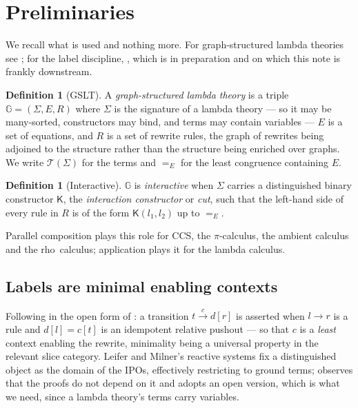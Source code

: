 \documentclass[11pt]{article}
\theoremstyle{plain}
\theoremstyle{definition}
\newtheorem{definition}[theorem]{Definition}
\newcommand{\rhoc}{\textsf{rho}}
\newcommand{\Kc}{\mathsf{K}}
\newcommand{\Gg}{\mathbb{G}}
\newcommand{\Terms}{\mathcal{T}}
\begin{document}
\section{Preliminaries}
\label{sec:prelim}

We recall what is used and nothing more. For graph-structured lambda theories see \cite{Omnibus}; for
the label discipline, \cite{BIHOL}, which is in preparation and on which this note is frankly
downstream.

\begin{definition}[GSLT]
A \emph{graph-structured lambda theory} is a triple $\Gg = (\Sigma, E, R)$ where $\Sigma$ is the
signature of a lambda theory --- so it may be many-sorted, constructors may bind, and terms may contain
variables --- $E$ is a set of equations, and $R$ is a set of rewrite rules, the graph of rewrites being
adjoined to the structure rather than the structure being enriched over graphs. We write
$\Terms(\Sigma)$ for the terms and $=_E$ for the least congruence containing $E$.
\end{definition}

\begin{definition}[Interactive]
$\Gg$ is \emph{interactive} when $\Sigma$ carries a distinguished binary constructor $\Kc$, the
\emph{interaction constructor} or \emph{cut}, such that the left-hand side of every rule in $R$ is of
the form $\Kc(l_1,l_2)$ up to $=_E$.
\end{definition}

Parallel composition plays this role for CCS, the $\pi$-calculus, the ambient calculus and the \rhoc\
calculus; application plays it for the lambda calculus.

\subsection{Labels are minimal enabling contexts}

Following \cite{LeiferMilner} in the open form of \cite{BIHOL}: a transition $t \xrightarrow{c} d[r]$
is asserted when $l \to r$ is a rule and $d[l] = c[t]$ is an idempotent relative pushout --- so that
$c$ is a \emph{least} context enabling the rewrite, minimality being a universal property in the
relevant slice category. Leifer and Milner's reactive systems fix a distinguished object as the domain
of the IPOs, effectively restricting to ground terms; \cite{BIHOL} observes that the proofs do not
depend on it and adopts an open version, which is what we need, since a lambda theory's terms carry
variables.
\end{document}
